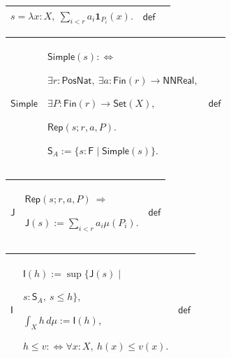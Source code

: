 \documentclass[11pt]{amsart}
\newlength{\FTCThreeColumnBody}
\begin{document}
{\begin{tabular}{|@{}>{\centering\arraybackslash}m{0.251968\FTCThreeColumnBody}|>{\centering\arraybackslash}m{0.590551\FTCThreeColumnBody}|>{\centering\arraybackslash}m{0.157480\FTCThreeColumnBody}|}
$\displaystyle s=\lambda x:X,\ \sum_{i<r}a_i\mathbf1_{P_i}(x).$ & $\displaystyle \textsf{def}$\\ \hline
\end{tabular}%
\par\setlength{\parskip}{0pt}\nointerlineskip
\noindent
\begin{tabular}{|@{}>{\centering\arraybackslash}m{0.251968\FTCThreeColumnBody}|>{\centering\arraybackslash}m{0.590551\FTCThreeColumnBody}|>{\centering\arraybackslash}m{0.157480\FTCThreeColumnBody}|}\hline
\hypertarget{def:Simple}{$\displaystyle \textsf{Simple}$} & $\displaystyle \textsf{Simple}(s):\Longleftrightarrow$\par
$\displaystyle \exists r:\textsf{PosNat},\ \exists a:\textsf{Fin}(r)\to\textsf{NNReal},$\par
$\displaystyle \exists P:\textsf{Fin}(r)\to\textsf{Set}(X),$\par
$\displaystyle \textsf{Rep}(s;r,a,P).$\par
$\displaystyle \textsf{S}_A:=\{s:\textsf{F}\mid\textsf{Simple}(s)\}.$ & $\displaystyle \textsf{def}$\\ \hline
\end{tabular}%
\par\setlength{\parskip}{0pt}\nointerlineskip
\noindent
\begin{tabular}{|@{}>{\centering\arraybackslash}m{0.251968\FTCThreeColumnBody}|>{\centering\arraybackslash}m{0.590551\FTCThreeColumnBody}|>{\centering\arraybackslash}m{0.157480\FTCThreeColumnBody}|}\hline
\hypertarget{def:J}{$\displaystyle \textsf{J}$} & $\displaystyle \textsf{Rep}(s;r,a,P)\ \Longrightarrow$\par
$\displaystyle \textsf{J}(s):=\sum_{i<r}a_i\mu(P_i).$ & $\displaystyle \textsf{def}$\\ \hline
\end{tabular}%
\par\setlength{\parskip}{0pt}\nointerlineskip
\noindent
\begin{tabular}{|@{}>{\centering\arraybackslash}m{0.251968\FTCThreeColumnBody}|>{\centering\arraybackslash}m{0.590551\FTCThreeColumnBody}|>{\centering\arraybackslash}m{0.157480\FTCThreeColumnBody}|}\hline
\hypertarget{def:I}{$\displaystyle \textsf{I}$} & $\displaystyle \textsf{I}(h):=\sup\{\textsf{J}(s)\mid$\par
$\displaystyle s:\textsf{S}_A,\ s\le h\},$\par
$\displaystyle \int_Xh\,d\mu:=\textsf{I}(h),$\par
$\displaystyle h\le v:\Longleftrightarrow\forall x:X,\ h(x)\le v(x).$ & $\displaystyle \textsf{def}$\\ \hline

\end{tabular}}
\end{document}
